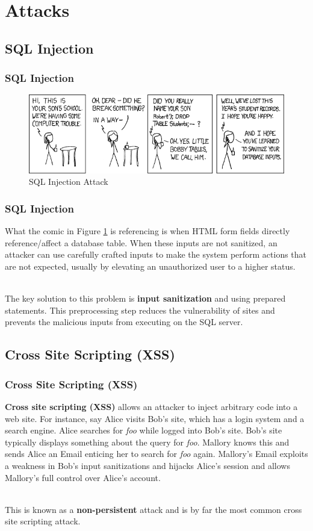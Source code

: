 \documentclass[aspectratio=169]{beamer}
\begin{document}
\section{Attacks}
\subsection{SQL Injection}
\begin{frame}
\frametitle{SQL Injection}
\begin{figure}
\includegraphics[scale=0.6]{../artifacts/bobby-tables.png}
\caption{SQL Injection Attack \cite{xkcd}}
\label{fig:bobbytables}
\end{figure}
\end{frame}

\begin{frame}
\frametitle{SQL Injection}
What the comic in Figure \ref{fig:bobbytables} is referencing is when HTML form fields directly reference/affect a database table. When these inputs are not sanitized, an attacker can use carefully crafted inputs to make the system perform actions that are not expected, usually by elevating an unauthorized user to a higher status.

\mbox{}\\
The key solution to this problem is \textbf{input sanitization} and using prepared statements. This preprocessing step reduces the vulnerability of sites and prevents the malicious inputs from executing on the SQL server.
\end{frame}

\subsection{Cross Site Scripting (XSS)}
\begin{frame}
\frametitle{Cross Site Scripting (XSS)}
\textbf{Cross site scripting (XSS)} allows an attacker to inject arbitrary code into a web site. For instance, say Alice visits Bob's site, which has a login system and a search engine. Alice searches for \textit{foo} while logged into Bob's site. Bob's site typically displays something about the query for \textit{foo}. Mallory knows this and sends Alice an Email enticing her to search for \textit{foo} again. Mallory's Email exploits a weakness in Bob's input sanitizations and hijacks Alice's session and allows Mallory's full control over Alice's account.

\mbox{}\\
This is known as a \textbf{non-persistent} attack and is by far the most common cross site scripting attack.
\end{frame}
\end{document}
